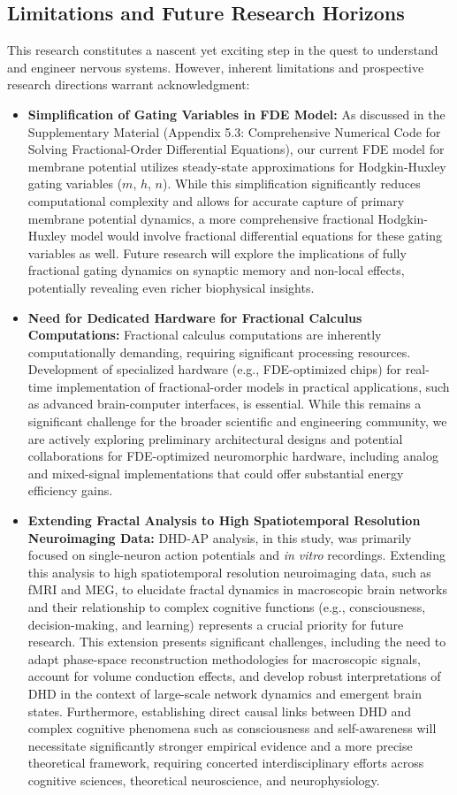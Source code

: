\documentclass{article}
\begin{document}
\subsection{Limitations and Future Research Horizons}

This research constitutes a nascent yet exciting step in the quest to understand and engineer nervous systems. However, inherent limitations and prospective research directions warrant acknowledgment:
\begin{itemize}
    \item \textbf{Simplification of Gating Variables in FDE Model:} As discussed in the Supplementary Material (Appendix 5.3: Comprehensive Numerical Code for Solving Fractional-Order Differential Equations), our current FDE model for membrane potential utilizes steady-state approximations for Hodgkin-Huxley gating variables ($m$, $h$, $n$). While this simplification significantly reduces computational complexity and allows for accurate capture of primary membrane potential dynamics, a more comprehensive fractional Hodgkin-Huxley model would involve fractional differential equations for these gating variables as well. Future research will explore the implications of fully fractional gating dynamics on synaptic memory and non-local effects, potentially revealing even richer biophysical insights.
    \item \textbf{Need for Dedicated Hardware for Fractional Calculus Computations:} Fractional calculus computations are inherently computationally demanding, requiring significant processing resources. Development of specialized hardware (e.g., FDE-optimized chips) for real-time implementation of fractional-order models in practical applications, such as advanced brain-computer interfaces, is essential. While this remains a significant challenge for the broader scientific and engineering community, we are actively exploring preliminary architectural designs and potential collaborations for FDE-optimized neuromorphic hardware, including analog and mixed-signal implementations that could offer substantial energy efficiency gains.
    \item \textbf{Extending Fractal Analysis to High Spatiotemporal Resolution Neuroimaging Data:} DHD-AP analysis, in this study, was primarily focused on single-neuron action potentials and \textit{in vitro} recordings. Extending this analysis to high spatiotemporal resolution neuroimaging data, such as fMRI and MEG, to elucidate fractal dynamics in macroscopic brain networks and their relationship to complex cognitive functions (e.g., consciousness, decision-making, and learning) represents a crucial priority for future research. This extension presents significant challenges, including the need to adapt phase-space reconstruction methodologies for macroscopic signals, account for volume conduction effects, and develop robust interpretations of DHD in the context of large-scale network dynamics and emergent brain states. Furthermore, establishing direct causal links between DHD and complex cognitive phenomena such as consciousness and self-awareness will necessitate significantly stronger empirical evidence and a more precise theoretical framework, requiring concerted interdisciplinary efforts across cognitive sciences, theoretical neuroscience, and neurophysiology.

\end{itemize}
\end{document}
